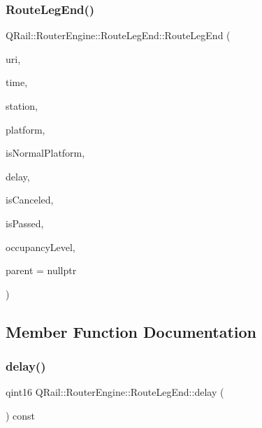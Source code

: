 \subsubsection{\texorpdfstring{RouteLegEnd()}{RouteLegEnd()}}
{\footnotesize\ttfamily Q\+Rail\+::\+Router\+Engine\+::\+Route\+Leg\+End\+::\+Route\+Leg\+End (\begin{DoxyParamCaption}\item[{const Q\+Url \&}]{uri,  }\item[{const Q\+Date\+Time \&}]{time,  }\item[{\mbox{\hyperlink{classQRail_1_1StationEngine_1_1Station}{Station\+Engine\+::\+Station}} $\ast$}]{station,  }\item[{const Q\+String \&}]{platform,  }\item[{const bool \&}]{is\+Normal\+Platform,  }\item[{const qint16 \&}]{delay,  }\item[{const bool \&}]{is\+Canceled,  }\item[{const bool \&}]{is\+Passed,  }\item[{const \mbox{\hyperlink{classQRail_1_1VehicleEngine_1_1Stop_ad967ed81b19762bd582c1af07354a6d4}{Q\+Rail\+::\+Vehicle\+Engine\+::\+Stop\+::\+Occupancy\+Level}} \&}]{occupancy\+Level,  }\item[{Q\+Object $\ast$}]{parent = {\ttfamily nullptr} }\end{DoxyParamCaption})\hspace{0.3cm}{\ttfamily [explicit]}}



\subsection{Member Function Documentation}
\mbox{\label{classQRail_1_1RouterEngine_1_1RouteLegEnd_a3fa63ac9d26898a8424c785ea1468e23}} 
\subsubsection{\texorpdfstring{delay()}{delay()}}
{\footnotesize\ttfamily qint16 Q\+Rail\+::\+Router\+Engine\+::\+Route\+Leg\+End\+::delay (\begin{DoxyParamCaption}{ }\end{DoxyParamCaption}) const}

